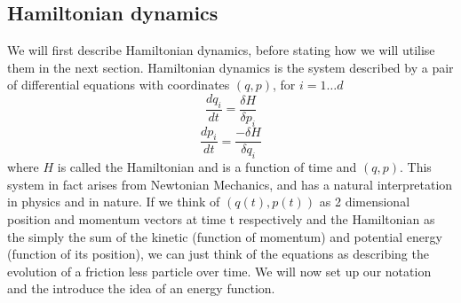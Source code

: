 \documentclass[11pt]{article}
\begin{document}
\subsection{Hamiltonian dynamics}
We will first describe Hamiltonian dynamics, before stating how we will utilise them in the next section. Hamiltonian dynamics is the system described by a pair of differential equations with coordinates $(q,p)$, for $i=1 \dots d$
\begin{equation}
\frac{dq_{i}}{dt} = \frac{\delta H}{\delta p_{i}}
\end{equation}
\begin{equation}
\frac{dp_{i}}{dt} = \frac{-\delta H}{\delta q_{i}}
\end{equation}
where $H$ is called the Hamiltonian and is a function of time and $(q,p)$. This system in fact arises from Newtonian Mechanics, and has a natural interpretation in physics and in nature. If we think of $(q(t),p(t))$ as 2 dimensional position and momentum  vectors at time t respectively and the Hamiltonian as the simply the sum of the kinetic (function of momentum) and potential energy (function of its position), we can just think of the equations as describing the evolution of a friction less particle over time. We will now set up our notation and the introduce the idea of an energy function.
\end{document}
